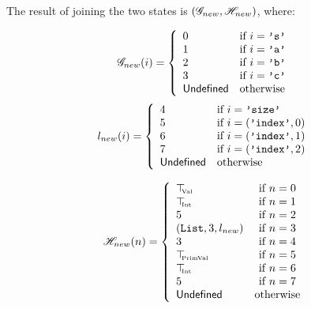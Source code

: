 The result of joining the two states is \((\mathscr{G}_{new}, \mathscr{H}_{new})\), where:
\\[.4em]

\begin{minipage}{0.45\textwidth}
  \[\mathscr{G}_{new}(i) = \left\{
    \begin{array}{ll}
      0 & \text{if } i = \texttt{'s'} \\
      1 & \text{if } i = \texttt{'a'} \\
      2 & \text{if } i = \texttt{'b'} \\
      3 & \text{if } i = \texttt{'c'} \\
      \mathsf{Undefined}      & \text{otherwise} \\
    \end{array}
  \right.\]
  \[l_{new}(i) = \left\{
    \begin{array}{ll}
      4 & \text{if } i = \texttt{'size'} \\
      5 & \text{if } i = (\texttt{'index'}, 0) \\
      6 & \text{if } i = (\texttt{'index'}, 1) \\
      7 & \text{if } i = (\texttt{'index'}, 2) \\
      \mathsf{Undefined}      & \text{otherwise} \\
    \end{array}
  \right.\]
\end{minipage}\hfill%
\begin{minipage}{0.45\textwidth}
  \[\mathscr{H}_{new}(n) = \left\{
    \begin{array}{lcl}
      \top_{\hspace{-1mm}{\text{\tiny{Val}}}} & \text{if } n = 0 \\
      \top_{\hspace{-1mm}{\text{\tiny{Int}}}} & \text{if } n = 1 \\
      5 & \text{if } n = 2 \\
      (\texttt{List}, 3, l_{new}) & \text{if } n = 3 \\
      3 & \text{if } n = 4 \\
      \top_{\hspace{-1mm}{\text{\tiny{PrimVal}}}} & \text{if } n = 5 \\
      \top_{\hspace{-1mm}{\text{\tiny{Int}}}} & \text{if } n = 6 \\
      5 & \text{if } n = 7 \\
      \mathsf{Undefined} & \text{otherwise} \\
    \end{array}
  \right.\]
\end{minipage}\hfill\\[0.4em]


